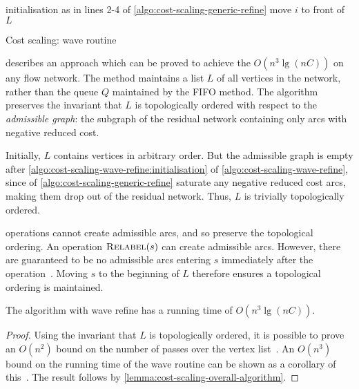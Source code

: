 \begin{algorithm}
\begin{algorithmic}[1]
    \State initialisation as in lines 2-4 of \label{algo:cost-scaling-wave-refine:initialisation} \cref{algo:cost-scaling-generic-refine}
     
    \Repeat
                \State {}
                    \State move $i$ to front of $L$
                \EndIf
            \EndIf
        \EndFor
    \EndFunction
\end{algorithmic}
\caption{Cost scaling: wave  routine}
\label{algo:cost-scaling-wave-refine}
\end{algorithm}

 describes an approach which can be proved to achieve the $O(n^3 \lg (nC))$ on any flow network. The method maintains a list $L$ of all vertices in the network, rather than the queue $Q$ maintained by the FIFO method. The algorithm preserves the invariant that $L$ is topologically ordered with respect to the \emph{admissible graph}: the subgraph of the residual network containing only arcs with negative reduced cost.

Initially, $L$ contains vertices in arbitrary order. But the admissible graph is empty after \cref{algo:cost-scaling-wave-refine:initialisation} of \cref{algo:cost-scaling-wave-refine}, since  of \cref{algo:cost-scaling-generic-refine} saturate any negative reduced cost arcs, making them drop out of the residual network. Thus, $L$ is trivially topologically ordered.

 operations cannot create admissible arcs, and so preserve the topological ordering. An operation $\textproc{Relabel}(s)$ can create admissible arcs. However, there are guaranteed to be no admissible arcs entering $s$ immediately after the operation~\cite[lemma~6.5]{Goldberg:1987}. Moving $s$ to the beginning of $L$ therefore ensures a topological ordering is maintained.\\

\begin{thm} \label{thm:cost-scaling-wave-complexity}
The algorithm with wave refine has a running time of $O(n^3 \lg (nC))$.
\end{thm}
\begin{proof}
Using the invariant that $L$ is topologically ordered, it is possible to prove an $O(n^2)$ bound on the number of passes over the vertex list~\cite[lemma~7.3]{Goldberg:1987}. An $O(n^3)$ bound on the running time of the wave  routine can be shown as a corollary of this~\cite[theorem~7.4]{Goldberg:1987}. The result follows by \cref{lemma:cost-scaling-overall-algorithm}.
\end{proof}

